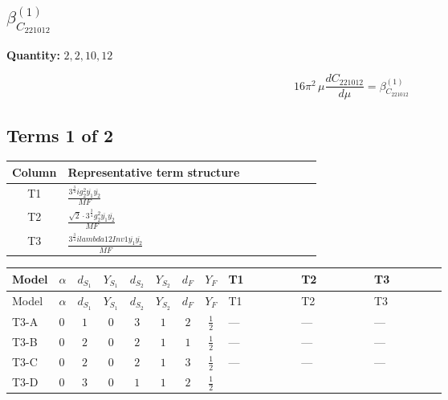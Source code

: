 \documentclass[8pt]{article}
\begin{document}
\begin{landscape}
\section*{$\beta_{C_{221012}}^{(1)}$}
\noindent\textbf{Quantity: }$\mathrm{2,2,10,12}$\par\smallskip
\[16\pi^2\,\mu\frac{d C_{221012}}{d\mu}=\beta_{C_{221012}}^{(1)}\]
\subsection*{Terms 1 of 2}
\begin{center}
\begin{tabular}{@{}c >{\raggedright\arraybackslash}p{0.82\linewidth}@{}}
\toprule
Column & Representative term structure \\
\midrule
T1 & \(\displaystyle \frac{3^{\frac{3}{4}} i g_{2}^{2} \overline{y_{1}} \overline{y_{2}}}{MF}\) \\
\midrule
T2 & \(\displaystyle \frac{\sqrt{2} \cdot 3^{\frac{3}{4}} g_{2}^{2} \overline{y_{1}} \overline{y_{2}}}{MF}\) \\
\midrule
T3 & \(\displaystyle \frac{3^{\frac{3}{4}} i lambda12Inv1 \overline{y_{1}} \overline{y_{2}}}{MF}\) \\
\midrule
\bottomrule
\end{tabular}
\end{center}
\smallskip
\tiny
\begin{longtable}{@{}llcccccc >{\raggedright\arraybackslash}p{0.21\linewidth} >{\raggedright\arraybackslash}p{0.21\linewidth} >{\raggedright\arraybackslash}p{0.21\linewidth}@{}}
\toprule
Model & $\alpha$ & $d_{S_1}$ & $Y_{S_1}$ & $d_{S_2}$ & $Y_{S_2}$ & $d_F$ & $Y_F$ & T1 & T2 & T3 \\
\midrule
\endfirsthead
\toprule
Model & $\alpha$ & $d_{S_1}$ & $Y_{S_1}$ & $d_{S_2}$ & $Y_{S_2}$ & $d_F$ & $Y_F$ & T1 & T2 & T3 \\
\midrule
\endhead
T3-A & $0$ & $1$ & $0$ & $3$ & $1$ & $2$ & $\frac{1}{2}$ & --- & --- & --- \\
\midrule
T3-B & $0$ & $2$ & $0$ & $2$ & $1$ & $1$ & $\frac{1}{2}$ & --- & --- & --- \\
\midrule
T3-C & $0$ & $2$ & $0$ & $2$ & $1$ & $3$ & $\frac{1}{2}$ & --- & --- & --- \\
\midrule
T3-D & $0$ & $3$ & $0$ & $1$ & $1$ & $2$ & $\frac{1}{2}$ & \scriptsize\adjustbox{max width=\linewidth}{$\begin{gathered} - \frac{17 \cdot 3^{\frac{3}{4}} i g_{2}^{2} \overline{y_{1}} \overline{y_{2}}}{24 MF}\end{gathered}$} & \scriptsize\adjustbox{max width=\linewidth}{$\begin{gathered} - \frac{\sqrt{2} \cdot 3^{\frac{3}{4}} g_{2}^{2} \overline{y_{1}} \overline{y_{2}}}{3 MF}\end{gathered}$} & \scriptsize\adjustbox{max width=\linewidth}{$\begin{gathered} - \frac{3^{\frac{3}{4}} i lambda12Inv1 \overline{y_{1}} \overline{y_{2}}}{6 MF}\end{gathered}$} \\

\end{longtable}
\end{landscape}
\end{document}
